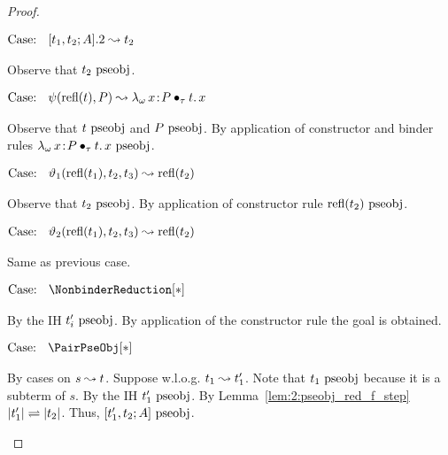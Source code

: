 \begin{proof}
\begin{proofcase}
        $\text{Case: }\begin{array}{c} [t_1, t_2; A].2 \leadsto t_2 \end{array}$
        \begin{proofcase}
            Observe that $t_2~\mbox{\normalfont pseobj}$.
        \end{proofcase}

        $\text{Case: }\begin{array}{c} \psi(\text{refl}(t),P) \leadsto {\lambda_\omega}\, x\! : \! P \bullet_{\tau} t.\, x \end{array}$
        \begin{proofcase}
            Observe that $t~\mbox{\normalfont pseobj}$ and $P~\mbox{\normalfont pseobj}$.
            By application of constructor and binder rules ${\lambda_\omega}\, x\! : \! P \bullet_{\tau} t.\, x~\mbox{\normalfont pseobj}$.
        \end{proofcase}

        $\text{Case: }\begin{array}{c} \vartheta_1(\text{refl}(t_1), t_2, t_3) \leadsto \text{refl}(t_2) \end{array}$
        \begin{proofcase}
            Observe that $t_2~\mbox{\normalfont pseobj}$.
            By application of constructor rule $\text{refl}(t_2)~\mbox{\normalfont pseobj}$.
        \end{proofcase}

        $\text{Case: }\begin{array}{c} \vartheta_2(\text{refl}(t_1), t_2, t_3) \leadsto \text{refl}(t_2) \end{array}$
        \begin{proofcase}
            Same as previous case.
        \end{proofcase}

        $\text{Case: }\begin{array}{c} \NonbinderReduction[*] \end{array}$
        \begin{proofcase}
            By the IH $t_i^\prime~\mbox{\normalfont pseobj}$.
            By application of the constructor rule the goal is obtained.
        \end{proofcase}

    \end{proofcase}

    $\text{Case: }\begin{array}{c} \PairPseObj[*] \end{array}$
    \begin{proofcase}
        By cases on $s \leadsto t$.
        Suppose w.l.o.g. $t_1 \leadsto t_1^\prime$.
        Note that $t_1~\mbox{\normalfont pseobj}$ because it is a subterm of $s$.
        By the IH $t_1^\prime~\mbox{\normalfont pseobj}$.
        By Lemma~\ref{lem:2:pseobj_red_f_step} $|t_1^\prime| \rightleftharpoons |t_2|$.
        Thus, $[t_1^\prime, t_2; A]~\mbox{\normalfont pseobj}$.
    \end{proofcase}


\end{proof}
